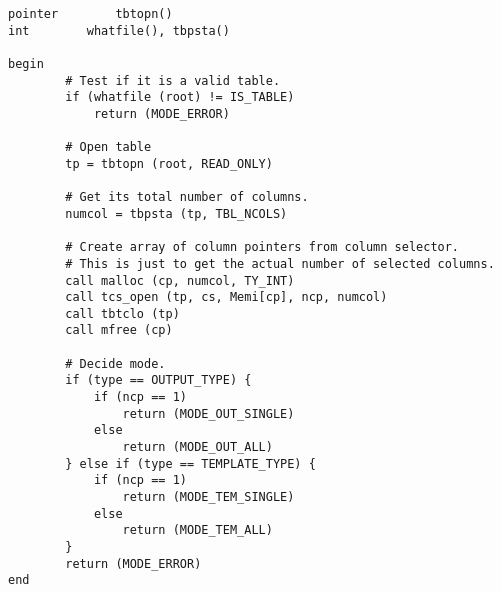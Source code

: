 \begin{verbatim}
pointer        tbtopn()
int        whatfile(), tbpsta()

begin
        # Test if it is a valid table.
        if (whatfile (root) != IS_TABLE)
            return (MODE_ERROR)
 
        # Open table
        tp = tbtopn (root, READ_ONLY)

        # Get its total number of columns.
        numcol = tbpsta (tp, TBL_NCOLS)

        # Create array of column pointers from column selector. 
        # This is just to get the actual number of selected columns.
        call malloc (cp, numcol, TY_INT)
        call tcs_open (tp, cs, Memi[cp], ncp, numcol)
        call tbtclo (tp)
        call mfree (cp)

        # Decide mode.
        if (type == OUTPUT_TYPE) {
            if (ncp == 1)
                return (MODE_OUT_SINGLE)
            else
                return (MODE_OUT_ALL)
        } else if (type == TEMPLATE_TYPE) {
            if (ncp == 1)
                return (MODE_TEM_SINGLE)
            else
                return (MODE_TEM_ALL)
        }
        return (MODE_ERROR)
end


\end{verbatim}
\newpage
{}
